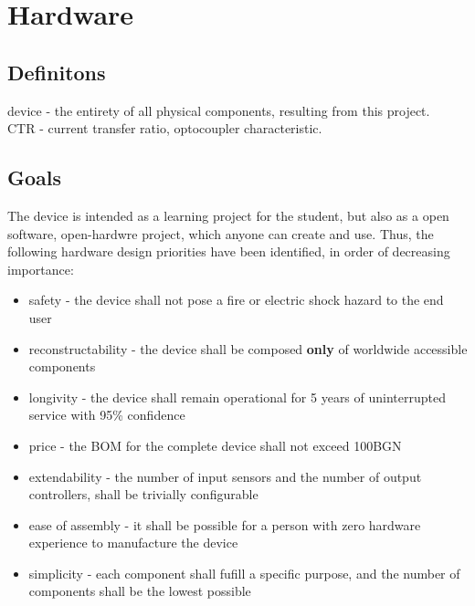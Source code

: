 \section{Hardware}
\subsection{Definitons}
device - the entirety of all physical components, resulting from this project.  \\
CTR - current transfer ratio, optocoupler characteristic.

\subsection{Goals}
The device is intended as a learning project for the student, but also as a open software, open-hardwre project, which anyone can create and use.
Thus, the following hardware design priorities have been identified, in order of decreasing importance:
\begin{itemize}
\item{safety - the device shall not pose a fire or electric shock hazard to the end user}
\item{reconstructability - the device shall be composed \textbf{only} of worldwide accessible components}
\item{longivity - the device shall remain operational for 5 years of uninterrupted service with 95\% confidence}
\item{price - the BOM for the complete device shall not exceed 100BGN}
\item{extendability - the number of input sensors and the number of output controllers, shall be trivially configurable}
\item{ease of assembly - it shall be possible for a person with zero hardware experience to manufacture the device}
\item{simplicity - each component shall fufill a specific purpose, and the number of components shall be the lowest possible}
\end{itemize}

